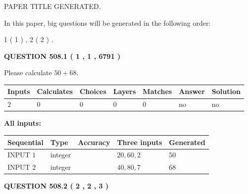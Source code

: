 \documentclass[12pt]{article}
\begin{document}
 
   
   
 PAPER TITLE GENERATED.
   
   
   
\vspace{0.2in}
   
In this paper, big questions will be generated in the following order: 
   
   
   1 ( 1 )
 ,
   2 ( 2 )
 .
  
\vspace{0.2in}
  
{\textbf{\Large{QUESTION
508.1 
 ( 1 , 1 , 6791 )
}}}
  
  
 
Please calculate $ %
50 +  %
68 $.
 
 
   
   
   
   
\noindent\begin{tabular}{|l|l|l|l|l|l|l|}
 \hline
Inputs & Calculates & Choices & Layers & Matches & Answer & Solution \\ \hline
 2  & 
 0  & 
 0
  & 
 0  & 
 0  & 
  no & 
  no 
  \\ \hline
 \end{tabular}
   
   
   
   
\noindent{}
   
   
   
   
\noindent\vspace{0.1in}\hspace{-0.08in} {\textbf{\Large{All inputs: }}}
   
   
  
  
\noindent\begin{tabular}{|l|l|l|l|l|}
\hline
 Sequential & Type & Accuracy & Three inputs & Generated \\ 
\hline
 
 
  INPUT $  1 $ & integer &  & $
 20
 , 
 60
 , 
 2
 $ & $ 50 $ 
 \\  \hline  
 
 
  INPUT $  2 $ & integer &  & $
 40
 , 
 80
 , 
 7
 $ & $ 68 $ 
 \\  \hline  
 \end{tabular}
   
   
  
\vspace{0.2in}
  
{\textbf{\Large{QUESTION
508.2 
 ( 2 , 2 , 3 )
}}}
  
\end{document}
